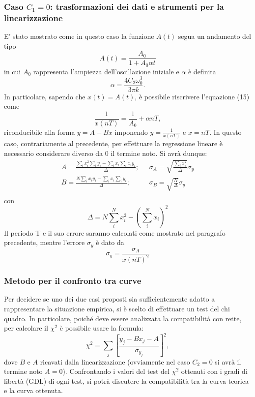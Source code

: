 \documentclass{article}
\begin{document}
\subsubsection{Caso $C_1=0$: trasformazioni dei dati e strumenti per la linearizzazione}
E' stato mostrato come in questo caso la funzione $A(t)$ segua un andamento del tipo
\begin{equation}
    A(t)=\frac{A_0}{1+A_0\alpha t}
\end{equation}
in cui $A_0$ rappresenta l'ampiezza dell'oscillazione iniziale e $\alpha$ è definita
\begin{equation}
    \alpha=\frac{4C_2\omega_0^3}{3\pi k}.
\end{equation}
In particolare, sapendo che $x(t)=A(t)$, è possibile riscrivere l'equazione (15) come 
\begin{equation}
    \frac{1}{x(nT)}=\frac{1}{A_0}+\alpha nT,
\end{equation}
riconducibile alla forma $y=A+Bx$ imponendo $y=\frac{1}{x(nT)}$ e $x=nT$. In questo caso, contrariamente al precedente, per effettuare la regressione lineare è necessario considerare diverso da $0$ il termine noto. Si avrà dunque:
\begin{align*}
    A=\frac{\sum_{i}x_i^2\sum_{i}y_i-\sum_{i}x_i\sum_{i}x_iy_i}{\Delta}; \ \ \ & \sigma_A=\sqrt{\frac{\sum_{i}x_i^2}{\Delta}}\sigma_y\\
    B=\frac{N\sum_{i}x_iy_i-\sum_{i}x_i\sum_{i}y_i}{\Delta}; \ \ \ & \sigma_B=\sqrt{\frac{N}{\Delta}}\sigma_y \\
\end{align*}
con 
\begin{equation*}
    \Delta=N\sum_{i}^{N}x_i^2-(\sum_{i}^{N}x_i)^2
\end{equation*}
Il periodo T e il suo errore saranno calcolati come mostrato nel paragrafo precedente, mentre l'errore $\sigma_y$ è dato da
\begin{equation}
   \sigma_y=\frac{\sigma_A}{x(nT)^2}
\end{equation}
\subsubsection{Metodo per il confronto tra curve }
Per decidere se uno dei due casi proposti sia sufficientemente adatto a rappresentare la situazione empirica, si  è scelto di effettuare un test del chi quadro. In particolare, poiché deve essere analizzata la compatibilità con rette, per calcolare il $\chi^2$ è possibile usare la formula:
\begin{equation}
    \chi^2=\sum_{j}\left[\frac{y_{j}-Bx_j-A}{\sigma_{y_j}}\right]^2,
\end{equation}
dove $B$ e $A$ ricavati dalla linearizzazione (ovviamente nel caso $C_2=0$ si avrà il termine noto $A=0$).
Confrontando i valori del test del $\chi^2$ ottenuti con i gradi di libertà (GDL) di ogni test, si potrà discutere la compatibilità tra la curva teorica e la curva ottenuta.
\end{document}
